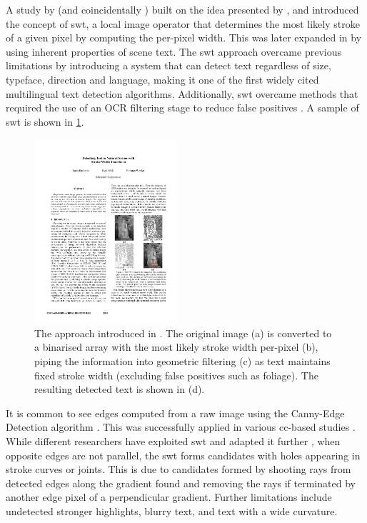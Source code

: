 A study by \citet{Epshtein:2010tj} (and coincidentally \citet{Zhang:2011cl}) built on the idea presented by \citeauthor{Subramanian:2007tf}, and introduced the concept of \gls{swt}, a local image operator that determines the most likely stroke of a given pixel by computing the per-pixel width. This was later expanded in \citet{Srivastav:2008ge} by using inherent properties of scene text. The \gls{swt} approach overcame previous limitations by introducing a system that can detect text regardless of size, typeface, direction and language, making it one of the first widely cited multilingual text detection algorithms. Additionally, \gls{swt} overcame methods that required the use of an OCR filtering stage to reduce false positives \citep{Chen:2004tx, XiangrongChen:2004ha, Ye:2005wu}. A sample of \gls{swt} is shown in \cref{fig:background:detection:cc:epshtein2010_swt}.

\begin{figure}[h]
  \centering
  \includegraphics[width=0.47\textwidth]{images/background/epshtein2010_swt}
  \caption[Stroke Width Transformation from \citet{Epshtein:2010tj}]{The  approach introduced in \citep{Epshtein:2010tj}. The original image (a) is converted to a binarised array with the most likely stroke width per-pixel (b), piping the information into geometric filtering (c) as text maintains fixed stroke width (excluding false positives such as foliage). The resulting detected text is shown in (d).}
  \label{fig:background:detection:cc:epshtein2010_swt}
\end{figure}

It is common to see edges computed from a raw image using the Canny-Edge Detection algorithm \citep{Canny:1986uw}. This was successfully applied in various \gls{cc}-based studies \citep{Epshtein:2010tj, Chen:2011ul, Zhang:2010wa}. While different researchers have exploited \gls{swt} and adapted it further \cite{Shivakumara:2011dn, Zhang:2011cl, Srivastav:2008ge}, when opposite edges are not parallel, the \gls{swt} forms candidates with holes appearing in stroke curves or joints. This is due to candidates formed by shooting rays from detected edges along the gradient found and removing the rays if terminated by another edge pixel of a perpendicular gradient. Further limitations include undetected stronger highlights, blurry text, and text with a wide curvature.

